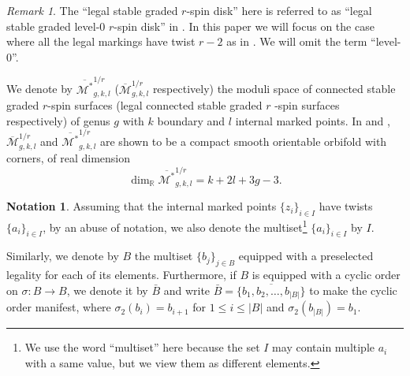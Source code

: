\documentclass[11pt]{amsart}
\theoremstyle{definition}
\newtheorem{nn}[dummy]{Notation}
\theoremstyle{remark}
\newtheorem{rmk}[dummy]{Remark}
\newcommand{\<}{\left<}
\renewcommand{\>}{\right>}
\numberwithin{equation}{section}
\def\Mbar{{\overline{\mathcal M}}}
\def\Mbarstar{{\overline{\mathcal M^*}}}
\begin{document}
\begin{rmk}
   The ``legal stable graded $r$-spin disk'' here is referred to as ``legal stable graded level-$0$ $r$-spin disk'' in \cite{TZ1,TZ2}. In %
this paper we %
will focus on the case where all the legal markings have twist $r-2$ as in \cite{BCT2}. We will omit the term %
``level-$0$''.
\end{rmk}





We %
denote by $\Mbarstar_{g,k,l}^{1/r}$ %
($\Mbar_{g,k,l}^{1/r}$ respectively) the %
moduli space of connected stable graded $r$-spin surfaces (legal connected stable graded $r$%
-spin surfaces respectively) %
of genus $g$ with $k$ boundary and $l$ internal marked points. In \cite[Theorem 3.4]{BCT1} and \cite[Theorem 2.8]{TZ1}, $\Mbar_{g,k,l}^{1/r}$ and $\Mbarstar_{g,k,l}^{1/r}$ are shown to be a compact smooth orientable orbifold %
with corners, of %
real dimension 
\begin{equation}\label{eq dim of moduli}
\dim_{\mathbb R} \Mbarstar_{g,k,l}^{1/r}=k+2l+3g-3.
\end{equation}



\begin{nn}
    Assuming that the internal marked points $\{z_i\}_{i\in I}$ have twists $\{a_i\}_{i\in I}$, by an abuse of notation, we also denote %
the multiset\footnote{We use the word ``multiset'' here because the set $I$ may contain multiple $a_i$ with a same value, but we view them as different elements.} $\{a_i\}_{i\in I}$ %
by $I$.
    
Similarly, we denote by $B$ the multiset $\{b_j\}_{j\in B}$ equipped with a preselected legality for each of its elements. Furthermore, if $B$ is equipped with a cyclic order on $\sigma\colon B\to B$, we denote it by $\bar B$ and write $\bar{B}=\overline{\{b_1,b_2,\dots,b_{\lvert B \rvert}\}}$ to make the cyclic order manifest, where $\sigma_2(b_i)=b_{i+1}$ for $1\le i \le \lvert B \rvert$ and $\sigma_2(b_{\lvert B \rvert})=b_{1}$.
\end{nn}
\end{document}

